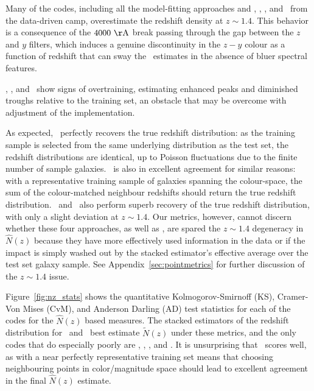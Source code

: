 Many of the codes, including all the model-fitting approaches and \annz, \gpz, \metaphor, and \skynet\ from the data-driven camp, overestimate the redshift density at $z \sim 1.4$.
This behavior is a consequence of the $4000\ {\rm \AA}$ break passing through the gap between the $z$ and $y$ filters, which induces a genuine discontinuity in the $z - y$ colour as a function of redshift that can sway the \pzpdf\ estimates in the absence of bluer spectral features.

\annz, \gpz, and \metaphor\ show signs of overtraining, estimating enhanced peaks and diminished troughs relative to the training set, an obstacle that may be overcome with adjustment of the implementation.

As expected, \trainz\ perfectly recovers the true redshift distribution: as the training sample is selected from the same underlying distribution as the test set, the redshift distributions are identical, up to Poisson fluctuations due to the finite number of sample galaxies.
\cmnn\ is also in excellent agreement for similar reasons: with a representative training sample of galaxies spanning the colour-space, the sum of the colour-matched neighbour redshifts should return the true redshift distribution.
\flexzboost\ and \tpz\ also perform superb recovery of the true redshift distribution, with only a slight deviation at $z \sim 1.4$.
Our metrics, however, cannot discern whether these four approaches, as well as \delight, are spared the $z \sim 1.4$ degeneracy in $\hat{N}(z)$ because they have more effectively used information in the data or if the impact is simply washed out by the stacked estimator's effective average over the test set galaxy sample.
See Appendix~\ref{sec:pointmetrics} for further discussion of the $z \sim 1.4$ issue.

Figure~\ref{fig:nz_stats} shows the quantitative Kolmogorov-Smirnoff (KS), Cramer-Von Mises (CvM), and Anderson Darling (AD) test statistics for each of the codes for the $\hat{N}(z)$ based measures.
The stacked estimators of the redshift distribution for \cmnn\ and \trainz\ best estimate $\tilde{N}(z)$ under these metrics, and the only codes that do especially poorly are \eazy, \lephare, \metaphor, and \skynet.
It is unsurprising that \cmnn\ scores well, as with a near perfectly representative training set means that choosing neighbouring points in color/magnitude space should lead to excellent agreement in the final $\hat{N}(z)$ estimate.

